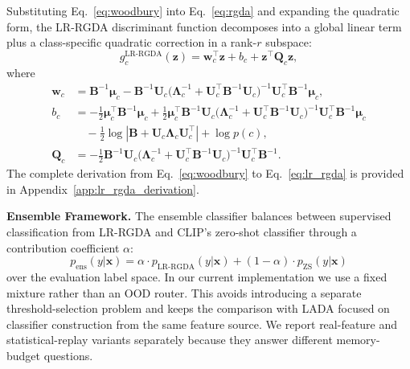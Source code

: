 \documentclass{article}
\begin{document}
Substituting Eq.~\eqref{eq:woodbury} into Eq.~\eqref{eq:rgda} and expanding the quadratic form, the LR-RGDA discriminant function decomposes into a global linear term plus a class-specific quadratic correction in a rank-$r$ subspace:
\begin{equation}
    g_c^{\text{LR-RGDA}}(\mathbf{z}) = \mathbf{w}_c^\top \mathbf{z} + b_c + \mathbf{z}^\top \mathbf{Q}_c \mathbf{z},
    \label{eq:lr_rgda}
\end{equation}
where
\begin{align}
    \mathbf{w}_c &= \mathbf{B}^{-1} \boldsymbol{\mu}_c - \mathbf{B}^{-1} \mathbf{U}_c \big(\boldsymbol{\Lambda}_c^{-1} + \mathbf{U}_c^\top \mathbf{B}^{-1} \mathbf{U}_c\big)^{-1} \mathbf{U}_c^\top \mathbf{B}^{-1} \boldsymbol{\mu}_c, \label{eq:wc}\\
    b_c &= -\frac{1}{2} \boldsymbol{\mu}_c^\top \mathbf{B}^{-1} \boldsymbol{\mu}_c + \frac{1}{2} \boldsymbol{\mu}_c^\top \mathbf{B}^{-1} \mathbf{U}_c \big(\boldsymbol{\Lambda}_c^{-1} + \mathbf{U}_c^\top \mathbf{B}^{-1} \mathbf{U}_c\big)^{-1} \mathbf{U}_c^\top \mathbf{B}^{-1} \boldsymbol{\mu}_c \nonumber\\
    &\quad -\frac{1}{2}\log|\mathbf{B} + \mathbf{U}_c \boldsymbol{\Lambda}_c \mathbf{U}_c^\top| + \log p(c), \label{eq:bc}\\
    \mathbf{Q}_c &= -\frac{1}{2} \mathbf{B}^{-1} \mathbf{U}_c \big(\boldsymbol{\Lambda}_c^{-1} + \mathbf{U}_c^\top \mathbf{B}^{-1} \mathbf{U}_c\big)^{-1} \mathbf{U}_c^\top \mathbf{B}^{-1}. \label{eq:qc}
\end{align}
The complete derivation from Eq.~\eqref{eq:woodbury} to Eq.~\eqref{eq:lr_rgda} is provided in Appendix~\ref{app:lr_rgda_derivation}.

\textbf{Ensemble Framework.}
The ensemble classifier balances between supervised classification from LR-RGDA and CLIP's zero-shot classifier through a contribution coefficient $\alpha$:
\begin{equation}
    p_{\text{ens}}(y|\mathbf{x}) = \alpha \cdot p_{\text{LR-RGDA}}(y|\mathbf{x}) + (1-\alpha) \cdot p_{\text{ZS}}(y|\mathbf{x})
\end{equation}
over the evaluation label space. In our current implementation we use a fixed mixture rather than an OOD router. This avoids introducing a separate threshold-selection problem and keeps the comparison with LADA focused on classifier construction from the same feature source. We report real-feature and statistical-replay variants separately because they answer different memory-budget questions.
\end{document}
